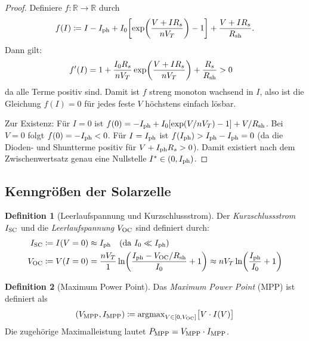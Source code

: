 ﻿\documentclass[a4paper,12pt]{article}
\theoremstyle{definition}
\newtheorem{definition}{Definition}[section]
\theoremstyle{remark}
\newcommand{\R}{\mathbb{R}}
\begin{document}
\begin{proof}
Definiere $f: \R \to \R$ durch
\begin{equation*}
  f(I) \coloneqq I - I_{\rm ph} + I_0\!\left[\exp\!\left(\frac{V + IR_s}{nV_T}\right) - 1\right]
  + \frac{V + IR_s}{R_{\rm sh}}.
\end{equation*}
Dann gilt:
\begin{align*}
  f'(I) &= 1 + \frac{I_0 R_s}{nV_T}\exp\!\left(\frac{V+IR_s}{nV_T}\right)
           + \frac{R_s}{R_{\rm sh}} > 0
\end{align*}
da alle Terme positiv sind. Damit ist $f$ streng monoton wachsend in $I$,
also ist die Gleichung $f(I) = 0$ für jedes feste $V$ höchstens einfach lösbar.

Zur Existenz: Für $I = 0$ ist
$f(0) = -I_{\rm ph} + I_0[\exp(V/nV_T)-1] + V/R_{\rm sh}$.
Bei $V = 0$ folgt $f(0) = -I_{\rm ph} < 0$.
Für $I = I_{\rm ph}$ ist
$f(I_{\rm ph}) > I_{\rm ph} - I_{\rm ph} = 0$ (da die Dioden- und
Shuntterme positiv für $V + I_{\rm ph} R_s > 0$).
Damit existiert nach dem Zwischenwertsatz genau eine Nullstelle
$I^* \in (0, I_{\rm ph})$.
\end{proof}

\subsection{Kenngrößen der Solarzelle}

\begin{definition}[Leerlaufspannung und Kurzschlussstrom]
Der \emph{Kurzschlussstrom} $I_{\rm SC}$ und die \emph{Leerlaufspannung}
$V_{\rm OC}$ sind definiert durch:
\begin{align}
  I_{\rm SC} &\coloneqq I(V=0) \approx I_{\rm ph}
    \quad\text{(da } I_0 \ll I_{\rm ph}\text{)} \label{eq:isc}\\
  V_{\rm OC} &\coloneqq V(I=0) = \frac{nV_T}{1}\ln\!\left(
    \frac{I_{\rm ph} - V_{\rm OC}/R_{\rm sh}}{I_0} + 1\right)
    \approx nV_T \ln\!\left(\frac{I_{\rm ph}}{I_0}+1\right) \label{eq:voc}
\end{align}
\end{definition}

\begin{definition}[Maximum Power Point]
\label{def:mpp}
Das \emph{Maximum Power Point} (MPP) ist definiert als
\begin{equation}
  (V_{\rm MPP}, I_{\rm MPP}) \coloneqq \operatorname{argmax}_{V \in [0, V_{\rm OC}]}
    \bigl[V \cdot I(V)\bigr]
  \label{eq:mpp_def}
\end{equation}
Die zugehörige Maximalleistung lautet $P_{\rm MPP} = V_{\rm MPP} \cdot I_{\rm MPP}$.
\end{definition}
\end{document}
